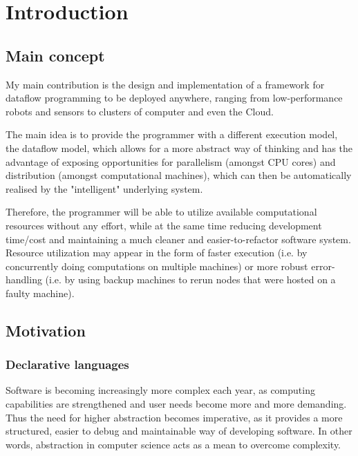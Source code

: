 \documentclass[sigplan,review,anonymous]{acmart}\settopmatter{printfolios=true}
\begin{document}
\maketitle

\section{Introduction}

\subsection{Main concept}

My main contribution is the design and implementation of a framework for dataflow programming to be deployed anywhere, ranging from low-performance robots and sensors to clusters of computer and even the Cloud. 

The main idea is to provide the programmer with a different execution model, the dataflow model, which allows for a more abstract way of thinking and has the advantage of exposing opportunities for parallelism (amongst CPU cores) and distribution (amongst computational machines), which can then be automatically realised by the "intelligent" underlying system. 

Therefore, the programmer will be able to utilize available computational resources without any effort, while at the same time reducing development time/cost and maintaining a much cleaner and easier-to-refactor software system. Resource utilization may appear in the form of faster execution (i.e. by concurrently doing computations on multiple machines) or more robust error-handling (i.e. by using backup machines to rerun nodes that were hosted on a faulty machine). 

\subsection{Motivation}

\subsubsection{Declarative languages}

Software is becoming increasingly more complex each year, as computing capabilities are strengthened and user needs become more and more demanding. Thus the need for higher abstraction becomes imperative, as it provides a more structured, easier to debug and maintainable way of developing software. In other words, abstraction in computer science acts as a mean to overcome complexity. 
\end{document}

